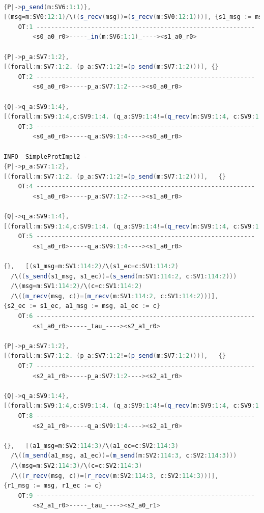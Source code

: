 \begin{lstlisting}[basicstyle=\scriptsize\ttfamily, language=java, frame=single]

{P|->p_send(m:SV6:1:1)},
[(msg=m:SV0:12:1)/\((s_recv(msg))=(s_recv(m:SV0:12:1)))], {s1_msg := msg, s1_ec := 0}
	OT:1 ------------------------------------------------------------
		<s0_a0_r0>-----_in(m:SV6:1:1)_----><s1_a0_r0>

{P|->p_a:SV7:1:2},
[(forall:m:SV7:1:2. (p_a:SV7:1:2!=(p_send(m:SV7:1:2)))], {}
	OT:2 ------------------------------------------------------------
		<s0_a0_r0>-----p_a:SV7:1:2----><s0_a0_r0>

{Q|->q_a:SV9:1:4},
[(forall:m:SV9:1:4,c:SV9:1:4. (q_a:SV9:1:4!=(q_recv(m:SV9:1:4, c:SV9:1:4)))],   {}
	OT:3 ------------------------------------------------------------
		<s0_a0_r0>-----q_a:SV9:1:4----><s0_a0_r0>

INFO  SimpleProtImpl2 - 
{P|->p_a:SV7:1:2},
[(forall:m:SV7:1:2. (p_a:SV7:1:2!=(p_send(m:SV7:1:2)))],   {}
	OT:4 ------------------------------------------------------------
		<s1_a0_r0>-----p_a:SV7:1:2----><s1_a0_r0>

{Q|->q_a:SV9:1:4},
[(forall:m:SV9:1:4,c:SV9:1:4. (q_a:SV9:1:4!=(q_recv(m:SV9:1:4, c:SV9:1:4)))],   {}
	OT:5 ------------------------------------------------------------
		<s1_a0_r0>-----q_a:SV9:1:4----><s1_a0_r0>

{},   [(s1_msg=m:SV1:114:2)/\(s1_ec=c:SV1:114:2)
  /\((s_send(s1_msg, s1_ec))=(s_send(m:SV1:114:2, c:SV1:114:2)))
  /\(msg=m:SV1:114:2)/\(c=c:SV1:114:2)
  /\((m_recv(msg, c))=(m_recv(m:SV1:114:2, c:SV1:114:2)))],
{s2_ec := s1_ec, a1_msg := msg, a1_ec := c}
	OT:6 ------------------------------------------------------------
		<s1_a0_r0>-----_tau_----><s2_a1_r0>

{P|->p_a:SV7:1:2},
[(forall:m:SV7:1:2. (p_a:SV7:1:2!=(p_send(m:SV7:1:2)))],   {}
	OT:7 ------------------------------------------------------------
		<s2_a1_r0>-----p_a:SV7:1:2----><s2_a1_r0>

{Q|->q_a:SV9:1:4},
[(forall:m:SV9:1:4,c:SV9:1:4. (q_a:SV9:1:4!=(q_recv(m:SV9:1:4, c:SV9:1:4)))],   {}
	OT:8 ------------------------------------------------------------
		<s2_a1_r0>-----q_a:SV9:1:4----><s2_a1_r0>

{},   [(a1_msg=m:SV2:114:3)/\(a1_ec=c:SV2:114:3)
  /\((m_send(a1_msg, a1_ec))=(m_send(m:SV2:114:3, c:SV2:114:3)))
  /\(msg=m:SV2:114:3)/\(c=c:SV2:114:3)
  /\((r_recv(msg, c))=(r_recv(m:SV2:114:3, c:SV2:114:3)))],
{r1_msg := msg, r1_ec := c}
	OT:9 ------------------------------------------------------------
		<s2_a1_r0>-----_tau_----><s2_a0_r1>


\end{lstlisting}
